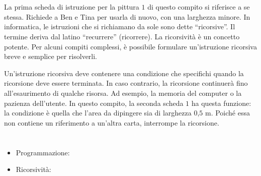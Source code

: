 {{%
\section*{\BrochureItsInformatics}
La prima scheda di istruzione per la pittura $1$ di questo compito si riferisce a se stessa. Richiede a Ben e Tina per usarla di nuovo, con una larghezza minore. In informatica, le istruzioni che si richiamano da sole sono dette \enquote{ricorsive}. Il termine deriva dal latino \enquote{recurrere} (ricorrere). La ricorsività è un concetto potente. Per alcuni compiti complessi, è possibile formulare un’istruzione ricorsiva breve e semplice per risolverli.

Un’istruzione ricorsiva deve contenere una condizione che specifichi quando la ricorsione deve essere terminata. In caso contrario, la ricorsione continuerà fino all’esaurimento di qualche risorsa. Ad esempio, la memoria del computer o la pazienza dell’utente. In questo compito, la seconda scheda $1$ ha questa funzione: la condizione è quella che l’area da dipingere sia di larghezza $0$,$5$ m. Poiché essa non contiene un riferimento a un’altra carta, interrompe la ricorsione.



\section*{\BrochureWebsitesAndKeywords}
{\raggedright
\begin{itemize}
  \item Programmazione: \href{https://it.wikipedia.org/wiki/Programmazione_(informatica)}{}
  \item Ricorsività: \href{https://it.wikipedia.org/wiki/Algoritmo_ricorsivo}{}
\end{itemize}


}

}{}

}

